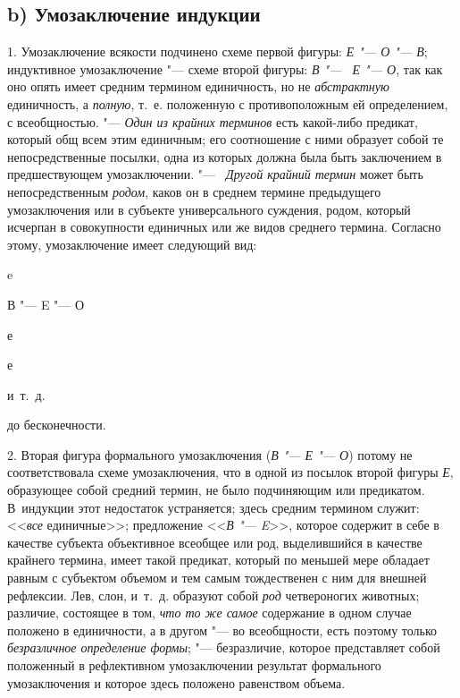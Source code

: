 {{\subsection[b) Умозаключение индукции]{b) Умозаключение индукции }
1. Умозаключение всякости подчинено схеме первой фигуры:
{\em Е "--- О
"--- В}; индуктивное умозаключение
"--- схеме второй фигуры:
{\em В "--- ~Е
"--- О}, так как оно опять имеет средним термином
единичность, но не {\em абстрактную}
единичность, а
{\em полную}, т.~е.
положенную с противоположным ей определением, с всеобщностью. "---
{\em Один из крайних терминов}
есть какой-либо предикат, который общ всем этим единичным;
его соотношение с ними образует собой те непосредственные посылки, одна из
которых должна была быть заключением в предшествующем умозаключении. "---
\ {\em Другой крайний термин}
может быть непосредственным
{\em родом}, каков он в
среднем термине предыдущего умозаключения или в субъекте универсального
суждения, родом, который исчерпан в совокупности единичных или же видов
среднего термина. Согласно этому, умозаключение имеет следующий вид:

{\centering
e
\par}

{\centering
В "--- E "--- О
\par}

{\centering
е
\par}

{\centering
е
\par}

{\centering
и~т.~д.
\par}

{\centering
до бесконечности.
\par}

2. Вторая фигура формального умозаключения
({\em В "--- Е "--- О}) потому не соответствовала схеме
умозаключения, что в одной из посылок второй фигуры
{\em Е}, образующее собой
средний термин, не было подчиняющим или предикатом. В~индукции этот
недостаток устраняется; здесь средним термином служит:
<<{\em все} единичные>>;
предложение <<{\em В
"--- E}>>,
которое содержит в себе в качестве субъекта объективное
всеобщее или род, выделившийся в качестве крайнего термина, имеет такой
предикат, который по меньшей мере обладает равным с субъектом объемом и тем
самым тождественен с ним для внешней рефлексии. Лев, слон, и~т.~д. образуют
собой {\em род}
четвероногих животных; различие, состоящее в том,
{\em что то же самое}
содержание в одном случае положено в единичности, а в другом
"--- во всеобщности, есть поэтому только
{\em безразличное определение формы};
"--- безразличие, которое представляет собой положенный в
рефлективном умозаключении результат формального умозаключения и которое
здесь положено равенством объема.

}}
